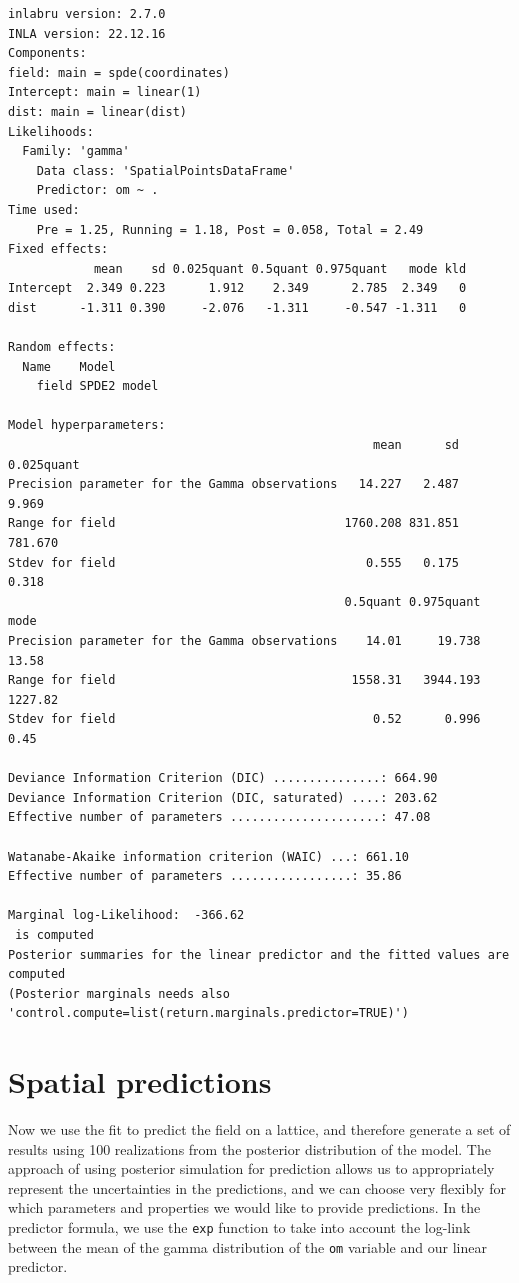 \documentclass[
  a4paper,
]{article}
\begin{document}
\begin{verbatim}
inlabru version: 2.7.0
INLA version: 22.12.16
Components:
field: main = spde(coordinates)
Intercept: main = linear(1)
dist: main = linear(dist)
Likelihoods:
  Family: 'gamma'
    Data class: 'SpatialPointsDataFrame'
    Predictor: om ~ .
Time used:
    Pre = 1.25, Running = 1.18, Post = 0.058, Total = 2.49 
Fixed effects:
            mean    sd 0.025quant 0.5quant 0.975quant   mode kld
Intercept  2.349 0.223      1.912    2.349      2.785  2.349   0
dist      -1.311 0.390     -2.076   -1.311     -0.547 -1.311   0

Random effects:
  Name    Model
    field SPDE2 model

Model hyperparameters:
                                                   mean      sd 0.025quant
Precision parameter for the Gamma observations   14.227   2.487      9.969
Range for field                                1760.208 831.851    781.670
Stdev for field                                   0.555   0.175      0.318
                                               0.5quant 0.975quant    mode
Precision parameter for the Gamma observations    14.01     19.738   13.58
Range for field                                 1558.31   3944.193 1227.82
Stdev for field                                    0.52      0.996    0.45

Deviance Information Criterion (DIC) ...............: 664.90
Deviance Information Criterion (DIC, saturated) ....: 203.62
Effective number of parameters .....................: 47.08

Watanabe-Akaike information criterion (WAIC) ...: 661.10
Effective number of parameters .................: 35.86

Marginal log-Likelihood:  -366.62 
 is computed 
Posterior summaries for the linear predictor and the fitted values are computed
(Posterior marginals needs also 'control.compute=list(return.marginals.predictor=TRUE)')
\end{verbatim}

\hypertarget{spatial-predictions}{%
\section{Spatial predictions}\label{spatial-predictions}}

Now we use the fit to predict the field on a lattice, and therefore
generate a set of results using 100 realizations from the posterior
distribution of the model. The approach of using posterior simulation
for prediction allows us to appropriately represent the uncertainties in
the predictions, and we can choose very flexibly for which parameters
and properties we would like to provide predictions. In the predictor
formula, we use the \texttt{exp} function to take into account the
log-link between the mean of the gamma distribution of the \texttt{om}
variable and our linear predictor.
\end{document}
